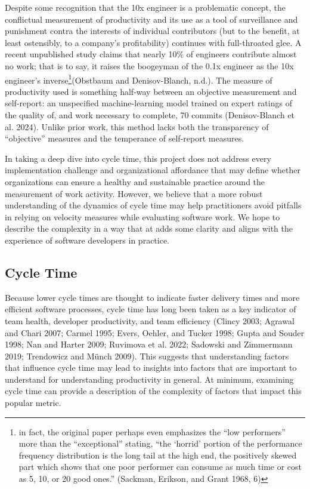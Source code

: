 \documentclass[
]{article}
\begin{document}
Despite some recognition that the 10x engineer is a problematic concept,
the conflictual measurement of productivity and its use as a tool of
surveillance and punishment contra the interests of individual
contributors (but to the benefit, at least ostensibly, to a company's
profitability) continues with full-throated glee. A recent unpublished
study claims that nearly 10\% of engineers contribute almost no work;
that is to say, it raises the boogeyman of the 0.1x engineer as the 10x
engineer's inverse\footnote{in fact, the original paper perhaps even
  emphasizes the ``low performers'' more than the ``exceptional''
  stating, ``the `horrid' portion of the performance frequency
  distribution is the long tail at the high end, the positively skewed
  part which shows that one poor performer can consume as much time or
  cost as 5, 10, or 20 good ones.'' (Sackman, Erikson, and Grant 1968,
  6)}(Obstbaum and Denisov-Blanch, n.d.). The measure of productivity
used is something half-way between an objective measurement and
self-report: an unspecified machine-learning model trained on expert
ratings of the quality of, and work necessary to complete, 70 commits
(Denisov-Blanch et al. 2024). Unlike prior work, this method lacks both
the transparency of ``objective'' measures and the temperance of
self-report measures.

In taking a deep dive into cycle time, this project does not address
every implementation challenge and organizational affordance that may
define whether organizations can ensure a healthy and sustainable
practice around the measurement of work activity. However, we believe
that a more robust understanding of the dynamics of cycle time may help
practitioners avoid pitfalls in relying on velocity measures while
evaluating software work. We hope to describe the complexity in a way
that at adds some clarity and aligns with the experience of software
developers in practice.

\subsection{Cycle Time}\label{cycle-time}

Because lower cycle times are thought to indicate faster delivery times
and more efficient software processes, cycle time has long been taken as
a key indicator of team health, developer productivity, and team
efficiency (Clincy 2003; Agrawal and Chari 2007; Carmel 1995; Evers,
Oehler, and Tucker 1998; Gupta and Souder 1998; Nan and Harter 2009;
Ruvimova et al. 2022; Sadowski and Zimmermann 2019; Trendowicz and Münch
2009). This suggests that understanding factors that influence cycle
time may lead to insights into factors that are important to understand
for understanding productivity in general. At minimum, examining cycle
time can provide a description of the complexity of factors that impact
this popular metric.
\end{document}
